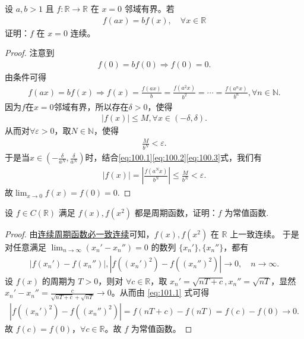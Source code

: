 \documentclass[../../main.tex]{subfiles}
\begin{document}
\begin{example}
设 \(a,b > 1\) 且 \(f: \mathbb{R} \to \mathbb{R}\) 在 \(x = 0\) 邻域有界。若
\begin{align*}
f(ax) = bf(x),\quad \forall x \in \mathbb{R}
\end{align*}
证明：\(f\) 在 \(x = 0\) 连续。 
\end{example}
\begin{proof}
注意到
\begin{align*}
f(0) = bf(0) \Rightarrow f(0) = 0.
\end{align*}
由条件可得
\begin{align}
f(ax) = bf(x) \Rightarrow f(x) = \frac{f(ax)}{b} = \frac{f(a^2x)}{b^2} = \cdots = \frac{f(a^nx)}{b^n}, \forall n \in \mathbb{N}. \label{eq:100.1}
\end{align}
因为\(f\)在\(x=0\)邻域有界，所以存在\(\delta > 0\)，使得
\begin{align}
|f(x)| \leqslant M, \forall x \in (-\delta, \delta). \label{eq:100.2}
\end{align}
从而对\(\forall \varepsilon > 0\)，取\(N \in \mathbb{N}\)，使得
\begin{align}
\frac{M}{b^N} < \varepsilon. \label{eq:100.3}
\end{align}
于是当\(x \in \left( -\frac{\delta}{a^N}, \frac{\delta}{a^N} \right)\)时，结合\eqref{eq:100.1}\eqref{eq:100.2}\eqref{eq:100.3}式，我们有
\begin{align*}
|f(x)| = \left| \frac{f(a^Nx)}{b^N} \right| \leqslant \frac{M}{b^N} < \varepsilon.
\end{align*}
故\(\lim_{x \to 0} f(x) = f(0) = 0.\)

\end{proof}

\begin{example}
设 \(f \in C(\mathbb{R})\) 满足 \(f(x), f(x^2)\) 都是周期函数，证明：\(f\) 为常值函数. 
\end{example}
\begin{proof}
由\hyperref[proposition:连续周期函数必一致连续]{连续周期函数必一致连续}可知，\(f(x),f(x^2)\) 在 \(\mathbb{R}\) 上一致连续。
于是对任意满足 \(\lim_{n \to \infty} (x_n' - x_n'') = 0\) 的数列 \(\{x_n'\}, \{x_n''\}\)，都有
\begin{align}
|f(x_n') - f(x_n'')|, |f((x_n')^2) - f((x_n'')^2)| \to 0, \quad n \to \infty. \label{eq:101.1}
\end{align}
设 \(f(x)\) 的周期为 \(T > 0\)，则对 \(\forall c \in \mathbb{R}\)，取 \(x_n' = \sqrt{nT + c}, x_n'' = \sqrt{nT}\)，显然 \(x_n' - x_n'' = \frac{c}{\sqrt{nT + c} + \sqrt{nT}} \to 0\)。从而由 \eqref{eq:101.1} 式可得
\begin{align*}
|f((x_n')^2) - f((x_n'')^2)| = f(nT + c) - f(nT) = f(c) - f(0) \to 0.
\end{align*}
故 \(f(c) = f(0)\)，\(\forall c \in \mathbb{R}\)。故 \(f\) 为常值函数。

\end{proof}
\end{document}
